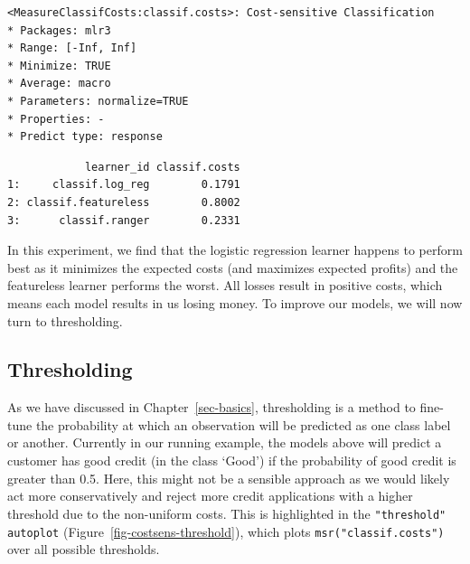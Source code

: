\begin{verbatim}
<MeasureClassifCosts:classif.costs>: Cost-sensitive Classification
* Packages: mlr3
* Range: [-Inf, Inf]
* Minimize: TRUE
* Average: macro
* Parameters: normalize=TRUE
* Properties: -
* Predict type: response
\end{verbatim}

\begin{Shaded}
\begin{Highlighting}[]
\OtherTok{=} \NormalTok{(}\NormalTok{(}\NormalTok{, }\NormalTok{,}
  \NormalTok{))}
\OtherTok{=} \NormalTok{(}
  \NormalTok{(}\NormalTok{, } \NormalTok{)))}
\SpecialCharTok{$}\NormalTok{(msr\_costs)[, }\NormalTok{(}\NormalTok{, }\NormalTok{)]}
\end{Highlighting}
\end{Shaded}

\begin{verbatim}
            learner_id classif.costs
1:     classif.log_reg        0.1791
2: classif.featureless        0.8002
3:      classif.ranger        0.2331
\end{verbatim}

In this experiment, we find that the logistic regression learner happens
to perform best as it minimizes the expected costs (and maximizes
expected profits) and the featureless learner performs the worst. All
losses result in positive costs, which means each model results in us
losing money. To improve our models, we will now turn to thresholding.

\hypertarget{thresholding-1}{%
\subsection{Thresholding}\label{thresholding-1}}

As we have discussed in Chapter~\ref{sec-basics},
thresholding is a method to fine-tune the
probability at which an observation will be predicted as one class label
or another. Currently in our running example, the models above will
predict a customer has good credit (in the class `Good') if the
probability of good credit is greater than 0.5. Here, this might not be
a sensible approach as we would likely act more conservatively and
reject more credit applications with a higher threshold due to the
non-uniform costs. This is highlighted in the \texttt{"threshold"}
\texttt{autoplot} (Figure~\ref{fig-costsens-threshold}), which plots
\texttt{msr("classif.costs")} over all possible thresholds.

